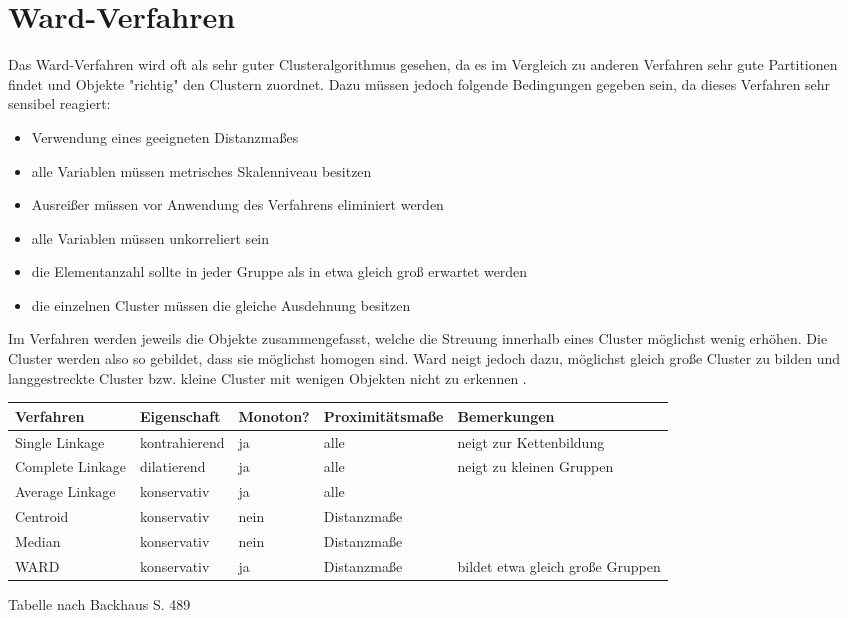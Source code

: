 \section{Ward-Verfahren}
Das Ward-Verfahren wird oft als sehr guter Clusteralgorithmus gesehen, da es im Vergleich zu anderen Verfahren sehr gute Partitionen findet und Objekte "richtig" den Clustern zuordnet. Dazu müssen jedoch folgende Bedingungen gegeben sein, da dieses Verfahren sehr sensibel reagiert: 

\begin{itemize}
	\item Verwendung eines geeigneten Distanzmaßes
	\item alle Variablen müssen metrisches Skalenniveau besitzen
	\item Ausreißer müssen vor Anwendung des Verfahrens eliminiert werden
	\item alle Variablen müssen unkorreliert sein
	\item die Elementanzahl sollte in jeder Gruppe als in etwa gleich groß erwartet werden
	\item die einzelnen Cluster müssen die gleiche Ausdehnung besitzen
\end{itemize}

Im Verfahren werden jeweils die Objekte zusammengefasst, welche die Streuung innerhalb eines Cluster möglichst wenig erhöhen. Die Cluster werden also so gebildet, dass sie möglichst homogen sind. Ward neigt jedoch dazu, möglichst gleich große Cluster zu bilden und langgestreckte Cluster bzw. kleine Cluster mit wenigen Objekten nicht zu erkennen \citep[Vgl.][S. 484]{Backhaus.2016}. \\

\begin{tabular}{|l|l|l|l|p{3.7cm}|}
	\hline
	\rowcolor{babyblueeyes}Verfahren & Eigenschaft & Monoton? & Proximitätsmaße & Bemerkungen \\ \hline
	\rowcolor{beaublue}Single Linkage & kontrahierend & ja & alle & neigt zur Kettenbildung \\ \hline
	\rowcolor{beaublue}Complete Linkage & dilatierend & ja & alle & neigt zu kleinen Gruppen \\ \hline	
	\rowcolor{beaublue}Average Linkage & konservativ & ja & alle & \\ \hline
	\rowcolor{beaublue}Centroid & konservativ & nein & Distanzmaße & \\ \hline
	\rowcolor{beaublue}Median & konservativ & nein & Distanzmaße & \\ \hline
	\rowcolor{beaublue}WARD & konservativ & ja & Distanzmaße & bildet etwa gleich große Gruppen \\ \hline
\end{tabular}
Tabelle nach Backhaus S. 489
